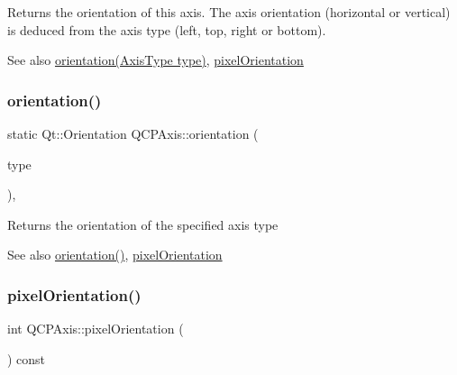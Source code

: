 Returns the orientation of this axis. The axis orientation (horizontal or vertical) is deduced from the axis type (left, top, right or bottom).

\begin{DoxySeeAlso}{See also}
\hyperlink{class_q_c_p_axis_a9a68b3e45f1b1e33d4d807822342516c}{orientation(\+Axis\+Type type)}, \hyperlink{class_q_c_p_axis_a45c45bed7e5666683b8d56afa66fa51f}{pixel\+Orientation} 
\end{DoxySeeAlso}
\mbox{\label{class_q_c_p_axis_a9a68b3e45f1b1e33d4d807822342516c}} 
\subsubsection{\texorpdfstring{orientation()}{orientation()}\hspace{0.1cm}{\footnotesize\ttfamily [2/2]}}
{\footnotesize\ttfamily static Qt\+::\+Orientation Q\+C\+P\+Axis\+::orientation (\begin{DoxyParamCaption}\item[{\hyperlink{class_q_c_p_axis_ae2bcc1728b382f10f064612b368bc18a}{Axis\+Type}}]{type }\end{DoxyParamCaption})\hspace{0.3cm}{\ttfamily [inline]}, {\ttfamily [static]}}

Returns the orientation of the specified axis type

\begin{DoxySeeAlso}{See also}
\hyperlink{class_q_c_p_axis_ab988ef4538e2655bb77bd138189cd42e}{orientation()}, \hyperlink{class_q_c_p_axis_a45c45bed7e5666683b8d56afa66fa51f}{pixel\+Orientation} 
\end{DoxySeeAlso}
\mbox{\label{class_q_c_p_axis_a45c45bed7e5666683b8d56afa66fa51f}} 
\subsubsection{\texorpdfstring{pixel\+Orientation()}{pixelOrientation()}}
{\footnotesize\ttfamily int Q\+C\+P\+Axis\+::pixel\+Orientation (\begin{DoxyParamCaption}{ }\end{DoxyParamCaption}) const\hspace{0.3cm}{\ttfamily [inline]}}

